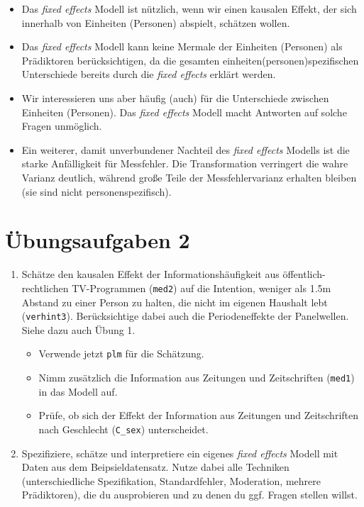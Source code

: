 \documentclass[]{book}
\providecommand{\tightlist}{%
  \setlength{\itemsep}{0pt}\setlength{\parskip}{0pt}}
\begin{document}
\begin{itemize}
\item
  Das \emph{fixed effects} Modell ist nützlich, wenn wir einen kausalen Effekt, der sich innerhalb von Einheiten (Personen) abspielt, schätzen wollen.
\item
  Das \emph{fixed effects} Modell kann keine Mermale der Einheiten (Personen) als Prädiktoren berücksichtigen, da die gesamten einheiten(personen)spezifischen Unterschiede bereits durch die \emph{fixed effects} erklärt werden.
\item
  Wir interessieren uns aber häufig (auch) für die Unterschiede zwischen Einheiten (Personen). Das \emph{fixed effects} Modell macht Antworten auf solche Fragen unmöglich.
\item
  Ein weiterer, damit unverbundener Nachteil des \emph{fixed effects} Modells ist die starke Anfälligkeit für Messfehler. Die Transformation verringert die wahre Varianz deutlich, während große Teile der Messfehlervarianz erhalten bleiben (sie sind nicht personenspezifisch).
\end{itemize}

\hypertarget{uxfcbungsaufgaben-2}{%
\section{Übungsaufgaben 2}\label{uxfcbungsaufgaben-2}}

\begin{enumerate}
\def\labelenumi{\arabic{enumi})}
\tightlist
\item
  Schätze den kausalen Effekt der Informationshäufigkeit aus öffentlich-rechtlichen TV-Programmen (\texttt{med2}) auf die Intention, weniger als 1.5m Abstand zu einer Person zu halten, die nicht im eigenen Haushalt lebt (\texttt{verhint3}). Berücksichtige dabei auch die Periodeneffekte der Panelwellen. Siehe dazu auch Übung 1.

  \begin{itemize}
  \tightlist
  \item
    Verwende jetzt \texttt{plm} für die Schätzung.
  \item
    Nimm zusätzlich die Information aus Zeitungen und Zeitschriften (\texttt{med1}) in das Modell auf.
  \item
    Prüfe, ob sich der Effekt der Information aus Zeitungen und Zeitschriften nach Geschlecht (\texttt{C\_sex}) unterscheidet.
  \end{itemize}
\item
  Spezifiziere, schätze und interpretiere ein eigenes \emph{fixed effects} Modell mit Daten aus dem Beipsieldatensatz. Nutze dabei alle Techniken (unterschiedliche Spezifikation, Standardfehler, Moderation, mehrere Prädiktoren), die du ausprobieren und zu denen du ggf. Fragen stellen willst.
\end{enumerate}
\end{document}
